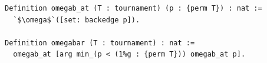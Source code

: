 \begin{lstlisting}[language=Rocq]
Definition omegab_at (T : tournament) (p : {perm T}) : nat :=
  `$\omega$`([set: backedge p]).

Definition omegabar (T : tournament) : nat :=
  omegab_at [arg min_(p < (1%g : {perm T})) omegab_at p].
\end{lstlisting}
